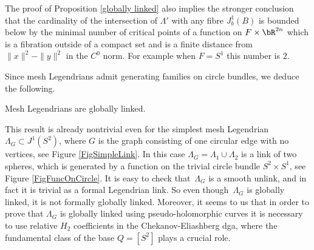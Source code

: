 \begin{remark}
The proof of Proposition \ref{globally linked} also implies the stronger conclusion that the cardinality of the intersection of $\Lambda'$ with any fibre $J^1_b(B)$ is bounded below by the minimal number of critical points of a function on $F \times \bR^{2n}$ which is a fibration outside of a compact set and is a finite distance from $\|x\|^2-\|y\|^2$ in the $C^0$ norm. For example when $F=S^1$ this number is $2$.
\end{remark}

Since mesh Legendrians admit generating families on circle bundles, we deduce the following.

\begin{corollary}\label{corollary: mesh Legendrians are globally linked}
Mesh Legendrians are globally linked.
\end{corollary}

This result is already nontrivial even for the simplest mesh Legendrian $\Lambda_G \subset J^1(S^2)$, where $G$ is the graph consisting of one circular edge with no vertices, see Figure \ref{FigSimpleLink}. In this case $\Lambda_G= \Lambda_1 \cup \Lambda_2$ is a link of two spheres, which is generated by a function on the trivial circle bundle $S^2 \times S^1$, see Figure \ref{FigFuncOnCircle}. It is easy to check that~$\Lambda_G$ is a smooth unlink, and in fact it is trivial as a formal Legendrian link. So even though~$\Lambda_G$ is globally linked, it is not formally globally linked. Moreover, it seems to us that in order to prove that $\Lambda_G$ is globally linked using pseudo-holomorphic curves it is necessary to use relative $H_2$ coefficients in the Chekanov-Eliashberg dga, where the fundamental class of the base $Q=[S^2]$ plays a crucial role.

